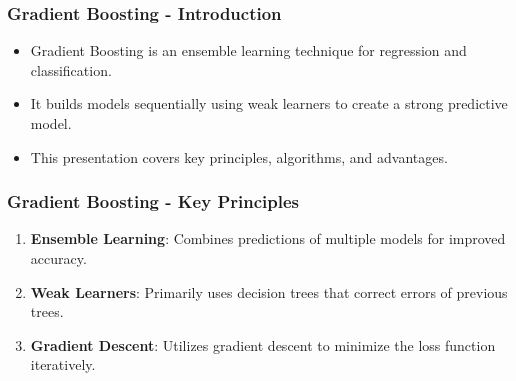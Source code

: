 \documentclass[aspectratio=169]{beamer}
\begin{document}
\begin{frame}[fragile]
    \frametitle{Gradient Boosting - Introduction}
    \begin{itemize}
        \item Gradient Boosting is an ensemble learning technique for regression and classification.
        \item It builds models sequentially using weak learners to create a strong predictive model.
        \item This presentation covers key principles, algorithms, and advantages.
    \end{itemize}
\end{frame}

\begin{frame}[fragile]
    \frametitle{Gradient Boosting - Key Principles}
    \begin{enumerate}
        \item \textbf{Ensemble Learning}: Combines predictions of multiple models for improved accuracy.
        \item \textbf{Weak Learners}: Primarily uses decision trees that correct errors of previous trees.
        \item \textbf{Gradient Descent}: Utilizes gradient descent to minimize the loss function iteratively.
    \end{enumerate}
\end{frame}
\end{document}

